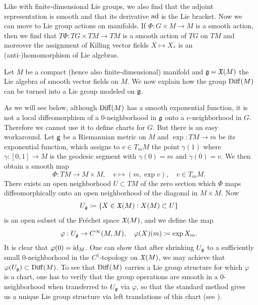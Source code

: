 Like with finite-dimensional Lie groups, we also find that the adjoint representation is smooth and that its derivative $\mathrm{ad}$ is the Lie bracket. Now we can move to Lie group actions on manifolds. If $\Phi:G\times M\to M$ is a smooth action, then we find that  $T\Phi:TG\times TM\to TM$ is a smooth action of $TG$ on $TM$ and moreover the assignment of Killing vector fields $X\mapsto X_\ast$ is an (anti-)homomorphism of Lie algebras.

\begin{example}
    Let $M$ be a compact (hence also finite-dimensional) manifold and $\mathfrak{g}=\mathfrak{X}(M)$ the Lie algebra of smooth vector fields on $M$. We now explain how the group $\operatorname{Diff}(M)$ can be turned into a Lie group modeled on $\mathfrak{g}$.

    
    As we will see below, although $\operatorname{Diff}(M)$ has a smooth exponential function, it is not a local diffeomorphism of a $0$-neighborhood in $\mathfrak{g}$ onto a $e$-neighborhood in $G$. Therefore we cannot use it to define charts for $G$. But there is an easy workaround. Let $\mathsf{g}$ be a Riemannian metric on $M$ and $\exp:TM\to m$ be its exponential function, which assigns to $v\in T_mM$ the point $\gamma(1)$ where $\gamma:[0,1]\to M$ is the geodesic segment with $\gamma(0)=m$ and $\dot\gamma(0)=v$. We then obtain a smooth map
    \[\Phi:TM\to M\times M,\quad v\mapsto (m,\exp v), \quad v\in T_mM.\]
    There exists an open neighborhood $U\subset TM$ of the zero section which $\Phi$ maps diffeomorphically onto an open neighborhood of the diagonal in $M\times M$. Now
    \[U_{\mathfrak{g}}\coloneqq \{X\in \mathfrak{X}(M):X(M)\subset U\}\]
    is an open subset of the Fr\'echet space $\mathfrak{X}(M)$, and we define the map
    \[\varphi:U_{\mathfrak{g}}\to C^\infty(M,M),\quad \varphi(X)(m)\coloneqq \exp X_m.\]
    It is clear that $\varphi(0)=\operatorname{id}_M$. One can show that after shrinking $U_{\mathfrak{g}}$ to a sufficiently small $0$-neighborhood in the $C^1$-topology on $\mathfrak{X}(M)$, we may achieve that $\varphi(U_{\mathfrak{g}})\subset \operatorname{Diff}(M)$. To see that $\operatorname{Diff}(M)$ carries a Lie group structure for which $\varphi$ is a chart, one has to verify that the group operations are smooth in a $0$-neighborhood when transferred to $U_{\mathfrak{g}}$ via $\varphi$, so that the standard method gives us a unique Lie group structure via left translations of this chart (see \cite[Thm.~9.4.4]{HN}). 
    

\end{example}
